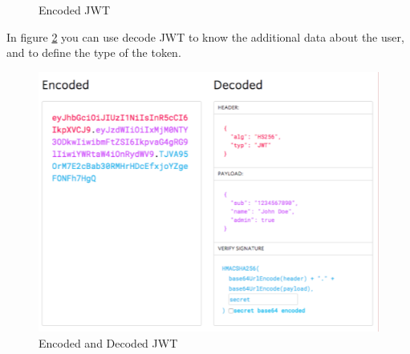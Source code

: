 \begin{enumerate}
\begin{enumerate}
\begin{figure}[htp]
    \caption[Encoded JWT]{Encoded JWT}\label{fig: jwt}%
  \end{figure}
    \end{enumerate}
    In figure \ref{fig: djwt} you can use decode JWT to  know the additional data about the user, and to define the type of the token.
 \begin{figure}[htp]%
    \center%
    \includegraphics[width=1\textwidth]{images/Software/legacy-app-auth-5.png}%
    \caption[Encoded and Decoded JWT]{Encoded and Decoded JWT}\label{fig: djwt}%
  \end{figure}
    \end{enumerate} \newpage
    
